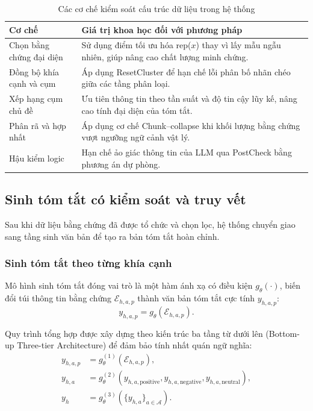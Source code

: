 \begin{table}[tbp]
\centering
\caption{Các cơ chế kiểm soát cấu trúc dữ liệu trong hệ thống}
\label{tab:method1-special-mechanisms}
\small
\begin{tabularx}{\textwidth}{L{0.25\textwidth} Y}
\toprule
\textbf{Cơ chế} & \textbf{Giá trị khoa học đối với phương pháp} \\
\midrule
Chọn bằng chứng đại diện & Sử dụng điểm tối ưu hóa rep($x$) thay vì lấy mẫu ngẫu nhiên, giúp nâng cao chất lượng minh chứng. \\
Đồng bộ khía cạnh và cụm & Áp dụng ResetCluster để hạn chế lỗi phân bố nhãn chéo giữa các tầng phân loại. \\
Xếp hạng cụm chủ đề & Ưu tiên thông tin theo tần suất và độ tin cậy lũy kế, nâng cao tính đại diện của tóm tắt. \\
Phân rã và hợp nhất & Áp dụng cơ chế Chunk--collapse khi khối lượng bằng chứng vượt ngưỡng ngữ cảnh vật lý. \\
Hậu kiểm logic & Hạn chế ảo giác thông tin của LLM qua PostCheck bằng phương án dự phòng. \\
\bottomrule
\end{tabularx}
\end{table}


\subsection{Sinh tóm tắt có kiểm soát và truy vết}
\label{subsec:method1-controlled-generation}

Sau khi dữ liệu bằng chứng đã được tổ chức và chọn lọc, hệ thống chuyển giao sang tầng sinh văn bản để tạo ra bản tóm tắt hoàn chỉnh.

\subsubsection{Sinh tóm tắt theo từng khía cạnh}
\label{subsubsec:method1-conditional-generation-flow}

Mô hình sinh tóm tắt đóng vai trò là một hàm ánh xạ có điều kiện $g_{\theta}(\cdot)$, biến đổi túi thông tin bằng chứng $\mathcal{E}_{h,a,p}$ thành văn bản tóm tắt cực tính $y_{h,a,p}$:
\begin{equation}
y_{h,a,p} = g_{\theta}\left( \mathcal{E}_{h,a,p} \right).
\label{eq:method1-sentiment-summary}
\end{equation}

Quy trình tổng hợp được xây dựng theo kiến trúc ba tầng từ dưới lên (Bottom-up Three-tier Architecture) để đảm bảo tính nhất quán ngữ nghĩa:
\begin{align}
y_{h,a,p} &= g^{(1)}_{\theta} \left(\mathcal{E}_{h,a,p}\right), \label{eq:method1-layer-sentiment}\\
y_{h,a} &= g^{(2)}_{\theta} \left(y_{h,a,\mathrm{positive}}, y_{h,a,\mathrm{negative}}, y_{h,a,\mathrm{neutral}}\right), \label{eq:method1-layer-aspect-summary}\\
y_h &= g^{(3)}_{\theta} \left(\{y_{h,a}\}_{a\in\mathcal{A}}\right). \label{eq:method1-layer-hotel}
\end{align}

